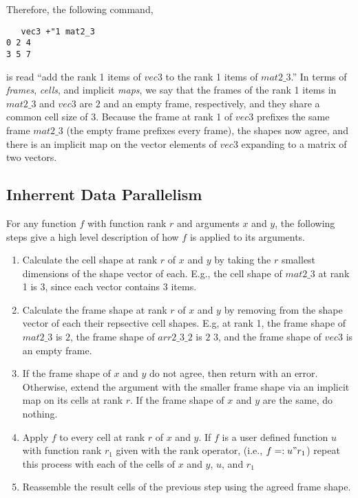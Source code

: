 Therefore, the following command, 

\begin{verbatim}
   vec3 +"1 mat2_3
0 2 4
3 5 7
\end{verbatim}

is read ``add the rank 1 items of $vec3$ to the rank 1 items of $mat2\_3$.''
In terms of \textit{frames}, \textit{cells}, and implicit \textit{maps}, we say that
the frames of the rank 1 items in $mat2\_3$ and $vec3$ are $2$ and an empty frame, respectively, and they share a common cell size of $3$.
Because the frame at rank 1 of $vec3$ prefixes the same frame $mat2\_3$ (the empty frame prefixes every frame), 
the shapes now agree, and there is an implicit map on the vector elements of $vec3$ expanding to a matrix of two vectors.

\subsection{Inherrent Data Parallelism}
For any function $f$ with function rank $r$ and arguments $x$ and $y$, 
the following steps give a high level description of how $f$ is applied to its arguments.\cite{rankanduni}
\begin{enumerate}
	\item Calculate the cell shape at rank $r$ of $x$ and $y$ 
		by taking the $r$ smallest dimensions of the shape vector of each.
		E.g., the cell shape of $mat2\_3$ at rank 1 is 3, since each vector contains 3 items.
	\item Calculate the frame shape at rank $r$ of $x$ and $y$ 
		by removing from the shape vector of each their repsective cell shapes.
		E.g, at rank 1, the frame shape of $mat2\_3$ is $2$,
		the frame shape of $arr2\_3\_2$ is $2$ $3$, 
		and the frame shape of $vec3$ is an empty frame.
	\item If the frame shape of $x$ and $y$ do not agree, then return with an error.
		Otherwise, extend the argument with the smaller frame shape via an implicit map on its cells at rank $r$.
		If the frame shape of $x$ and $y$ are the same, do nothing.
	\item \label{dataparstep}Apply $f$ to every cell at rank $r$ of $x$ and $y$.
		If $f$ is a user defined function $u$ with function rank $r_1$ given with the rank operator,
		(i.e., $f =: u"r_1$)
		repeat this process with each of the cells of $x$ and $y$, $u$, and $r_1$
	\item Reassemble the result cells of the previous step using the agreed frame shape.
\end{enumerate}

